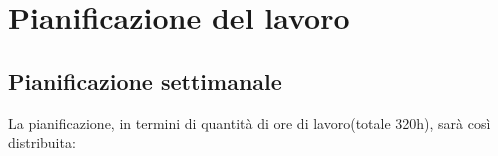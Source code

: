 \newpage
\section*{Pianificazione del lavoro}

\subsection*{Pianificazione settimanale}




La pianificazione, in termini di quantità di ore di lavoro(totale 320h), sarà così distribuita:


\begin{center}

    
\end{center}

\newpage
